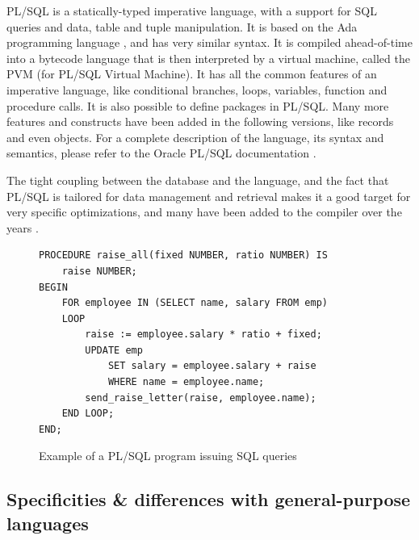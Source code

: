 \documentclass[twoside,11pt,a4paper]{article}
\newcommand{\todo}[1]{\textit{TODO: #1}}
\begin{document}
PL/SQL is a statically-typed imperative language, with a support for SQL queries and data, table and tuple manipulation. It is based on the Ada programming language \cite{adadoc}, and has very similar syntax. It is compiled ahead-of-time into a bytecode language that is then interpreted by a virtual machine, called the PVM (for PL/SQL Virtual Machine). It has all the common features of an imperative language, like conditional branches, loops, variables, function and procedure calls. It is also possible to define packages in PL/SQL. Many more features and constructs have been added in the following versions, like records and even objects. For a complete description of the language, its syntax and semantics, please refer to the Oracle PL/SQL documentation \cite{plsdoc}.

The tight coupling between the database and the language, and the fact that PL/SQL is tailored for data management and retrieval makes it a good target for very specific optimizations, and many have been added to the compiler over the years \cite{freedomplsopt}.



\begin{figure}[t]
	\begin{lstlisting}[style=PLSQL]
PROCEDURE raise_all(fixed NUMBER, ratio NUMBER) IS
	raise NUMBER;
BEGIN
	FOR employee IN (SELECT name, salary FROM emp)
	LOOP
		raise := employee.salary * ratio + fixed;
		UPDATE emp
			SET salary = employee.salary + raise
			WHERE name = employee.name;
		send_raise_letter(raise, employee.name);
	END LOOP;
END;
	\end{lstlisting}
	
	\caption{Example of a PL/SQL program issuing SQL queries}
	\label{fig:plsraiseall}
\end{figure}


\subsection{Specificities \& differences with general-purpose languages}
\end{document}
